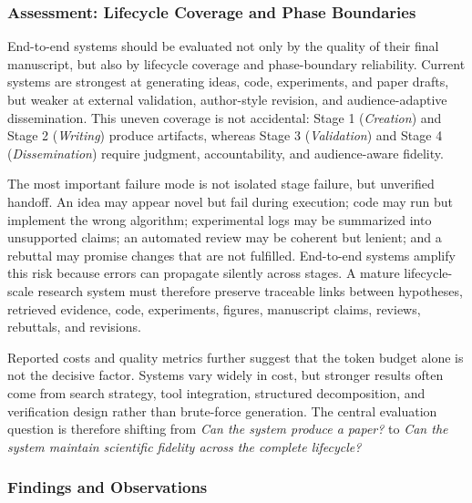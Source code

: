 \documentclass{llmxive}
\begin{document}
\subsubsection{Assessment: Lifecycle Coverage and Phase Boundaries}
\label{sec:e2e_assessment}

End-to-end systems should be evaluated not only by the quality of their final manuscript, but also by lifecycle coverage and phase-boundary reliability. Current systems are strongest at generating ideas, code, experiments, and paper drafts, but weaker at external validation, author-style revision, and audience-adaptive dissemination. This uneven coverage is not accidental: Stage 1 (\emph{Creation}) and Stage 2 (\emph{Writing}) produce artifacts, whereas Stage 3 (\emph{Validation}) and Stage 4 (\emph{Dissemination}) require judgment, accountability, and audience-aware fidelity.

The most important failure mode is not isolated stage failure, but unverified handoff. An idea may appear novel but fail during execution; code may run but implement the wrong algorithm; experimental logs may be summarized into unsupported claims; an automated review may be coherent but lenient; and a rebuttal may promise changes that are not fulfilled. End-to-end systems amplify this risk because errors can propagate silently across stages. A mature lifecycle-scale research system must therefore preserve traceable links between hypotheses, retrieved evidence, code, experiments, figures, manuscript claims, reviews, rebuttals, and revisions.

Reported costs and quality metrics further suggest that the token budget alone is not the decisive factor. Systems vary widely in cost, but stronger results often come from search strategy, tool integration, structured decomposition, and verification design rather than brute-force generation. The central evaluation question is therefore shifting from \emph{Can the system produce a paper?} to \emph{Can the system maintain scientific fidelity across the complete lifecycle?}







\subsubsection{Findings and Observations}
\label{sec:e2e_findings}
\end{document}
